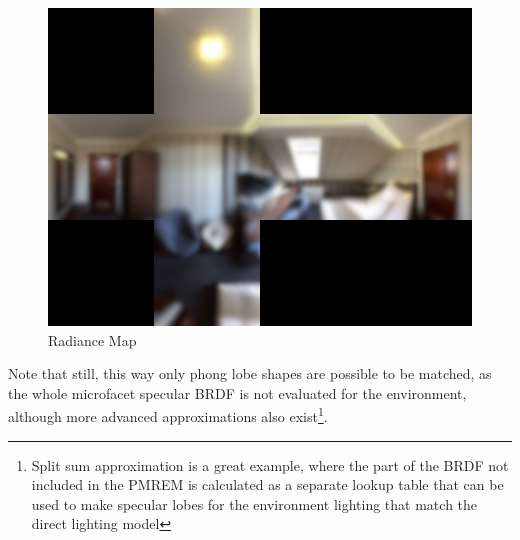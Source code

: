 \begin{figure}[ht]
    \centering
    \includegraphics[scale=0.36,clip=true]{./image/envl_rad.png}
    \caption{Radiance Map}
\label{fig:envlrad}
\end{figure}

Note that still, this way only phong lobe shapes are possible to be matched, as the whole microfacet specular
BRDF is not evaluated for the environment, although more advanced approximations also exist\footnote{Split sum approximation is a great
example, where the part of the BRDF not included in the PMREM is calculated as a separate lookup table that can be used to make
specular lobes for the environment lighting that match the direct lighting model}.
